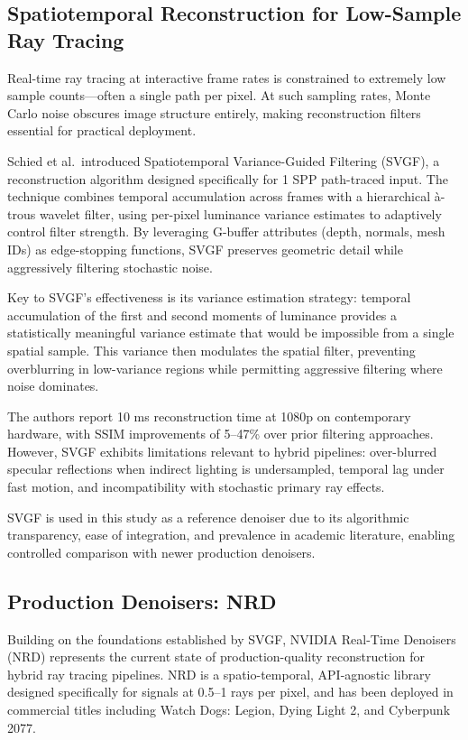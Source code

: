 \documentclass[12pt,a4paper]{report}
\begin{document}
\subsection{Spatiotemporal Reconstruction for Low-Sample Ray Tracing}

Real-time ray tracing at interactive frame rates is constrained to extremely 
low sample counts—often a single path per pixel. At such sampling rates, 
Monte Carlo noise obscures image structure entirely, making reconstruction 
filters essential for practical deployment.

Schied et al.\ introduced Spatiotemporal Variance-Guided Filtering (SVGF), 
a reconstruction algorithm designed specifically for 1 SPP path-traced input. 
The technique combines temporal accumulation across frames with a hierarchical 
à-trous wavelet filter, using per-pixel luminance variance estimates to 
adaptively control filter strength. By leveraging G-buffer attributes 
(depth, normals, mesh IDs) as edge-stopping functions, SVGF preserves 
geometric detail while aggressively filtering stochastic noise.

Key to SVGF's effectiveness is its variance estimation strategy: temporal 
accumulation of the first and second moments of luminance provides a 
statistically meaningful variance estimate that would be impossible from 
a single spatial sample. This variance then modulates the spatial filter, 
preventing overblurring in low-variance regions while permitting aggressive 
filtering where noise dominates.

The authors report 10 ms reconstruction time at 1080p on contemporary 
hardware, with SSIM improvements of 5–47\% over prior filtering approaches. 
However, SVGF exhibits limitations relevant to hybrid pipelines: 
over-blurred specular reflections when indirect lighting is undersampled, 
temporal lag under fast motion, and incompatibility with stochastic 
primary ray effects.

SVGF is used in this study as a reference denoiser due to its algorithmic transparency, ease of integration, and prevalence in academic literature, enabling controlled comparison with newer production denoisers.\cite{schied2017svgf}

\subsection{Production Denoisers: NRD}
Building on the foundations established by SVGF, NVIDIA Real-Time Denoisers (NRD) 
represents the current state of production-quality reconstruction for hybrid ray 
tracing pipelines. NRD is a spatio-temporal, API-agnostic library designed 
specifically for signals at 0.5--1 rays per pixel, and has been deployed in 
commercial titles including Watch Dogs: Legion, Dying Light 2, and Cyberpunk 2077\cite{nvidia_NRD_blog}.
\end{document}
